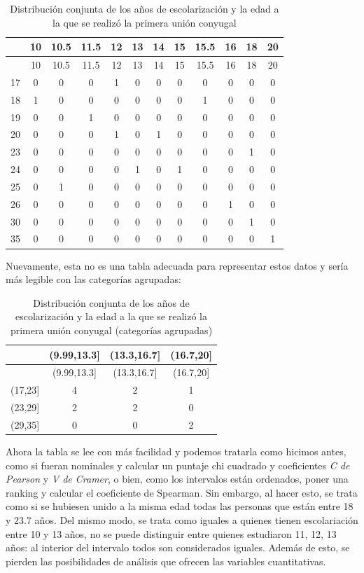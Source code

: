 \documentclass[]{book}
\begin{document}
\begin{longtable}[]{@{}lccccccccccc@{}}
\caption{\label{tab:unnamed-chunk-146}Distribución conjunta de los años de escolarización y la edad a la que se realizó la primera unión conyugal}\tabularnewline
\toprule
& 10 & 10.5 & 11.5 & 12 & 13 & 14 & 15 & 15.5 & 16 & 18 & 20\tabularnewline
\midrule
\endfirsthead
\toprule
& 10 & 10.5 & 11.5 & 12 & 13 & 14 & 15 & 15.5 & 16 & 18 & 20\tabularnewline
\midrule
\endhead
17 & 0 & 0 & 0 & 1 & 0 & 0 & 0 & 0 & 0 & 0 & 0\tabularnewline
18 & 1 & 0 & 0 & 0 & 0 & 0 & 0 & 1 & 0 & 0 & 0\tabularnewline
19 & 0 & 0 & 1 & 0 & 0 & 0 & 0 & 0 & 0 & 0 & 0\tabularnewline
20 & 0 & 0 & 0 & 1 & 0 & 1 & 0 & 0 & 0 & 0 & 0\tabularnewline
23 & 0 & 0 & 0 & 0 & 0 & 0 & 0 & 0 & 0 & 1 & 0\tabularnewline
24 & 0 & 0 & 0 & 0 & 1 & 0 & 1 & 0 & 0 & 0 & 0\tabularnewline
25 & 0 & 1 & 0 & 0 & 0 & 0 & 0 & 0 & 0 & 0 & 0\tabularnewline
26 & 0 & 0 & 0 & 0 & 0 & 0 & 0 & 0 & 1 & 0 & 0\tabularnewline
30 & 0 & 0 & 0 & 0 & 0 & 0 & 0 & 0 & 0 & 1 & 0\tabularnewline
35 & 0 & 0 & 0 & 0 & 0 & 0 & 0 & 0 & 0 & 0 & 1\tabularnewline
\bottomrule
\end{longtable}

Nuevamente, esta no es una tabla adecuada para representar estos datos y sería más legible con las categorías agrupadas:

\begin{longtable}[]{@{}lccc@{}}
\caption{\label{tab:unnamed-chunk-147}Distribución conjunta de los años de escolarización y la edad a la que se realizó la primera unión conyugal (categorías agrupadas)}\tabularnewline
\toprule
& (9.99,13.3{]} & (13.3,16.7{]} & (16.7,20{]}\tabularnewline
\midrule
\endfirsthead
\toprule
& (9.99,13.3{]} & (13.3,16.7{]} & (16.7,20{]}\tabularnewline
\midrule
\endhead
(17,23{]} & 4 & 2 & 1\tabularnewline
(23,29{]} & 2 & 2 & 0\tabularnewline
(29,35{]} & 0 & 0 & 2\tabularnewline
\bottomrule
\end{longtable}

Ahora la tabla se lee con más facilidad y podemos tratarla como hicimos antes, como si fueran nominales y calcular un puntaje chi cuadrado y coeficientes \emph{C de Pearson} y \emph{V de Cramer}, o bien, como los intervalos están ordenados, poner una ranking y calcular el coeficiente de Spearman. Sin embargo, al hacer esto, se trata como si se hubiesen unido a la misma edad todas las personas que están entre 18 y 23.7 años. Del mismo modo, se trata como iguales a quienes tienen escolariación entre 10 y 13 años, no se puede distinguir entre quienes estudiaron 11, 12, 13 años: al interior del intervalo todos son considerados iguales. Además de esto, se pierden las posibilidades de análisis que ofrecen las variables cuantitativas.
\end{document}
